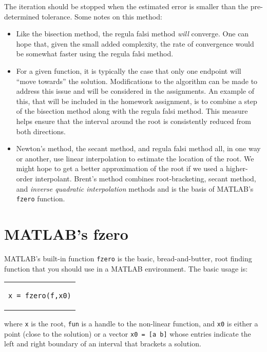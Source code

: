 The iteration should be stopped when the estimated error is smaller than the pre-determined tolerance.  Some notes on this method:
\begin{itemize}
\item Like the bisection method, the regula falsi method \emph{will} converge.  One can hope that, given the small added complexity, the rate of convergence would be somewhat faster using the regula falsi method.
\item For a given function, it is typically the case that only one endpoint will ``move towards'' the solution.  Modifications to the algorithm can be made to address this issue and will be considered in the assignments.  An example of this, that will be included in the homework assignment, is to combine a step of the bisection method along with the regula falsi method.  This measure helps ensure that the interval around the root is consistently reduced from both directions. 
\item Newton's method, the secant method, and regula falsi method all, in one way or another, use linear interpolation to estimate the location of the root.  We might hope to get a better approximation of the root if we used a higher-order interpolant. Brent's method combines root-bracketing, secant method, and \emph{inverse quadratic interpolation} methods and is the basis of MATLAB's \lstinline[style=myMatlab]{fzero} function.\cite{forsythe1977computer}
\end{itemize}


\section{MATLAB's fzero}
MATLAB's built-in function \lstinline[style=myMatlab]{fzero} is the basic, bread-and-butter, root finding function that you should use in a MATLAB environment.  The basic usage is:
\begin{center}
\begin{tabular}{c}
\begin{lstlisting}[style=myMatlab, frame=none, numbers=none, basicstyle=\large]
x = fzero(f,x0)
\end{lstlisting}
\end{tabular}
\end{center}
where \lstinline[style=myMatlab]{x} is the root, \lstinline[style=myMatlab]{fun} is a handle to the non-linear function, and \lstinline[style=myMatlab]{x0} is either a point (close to the solution) or a vector \lstinline[style=myMatlab]{x0 = [a b]} whose entries indicate the left and right boundary of an interval that brackets a solution.

